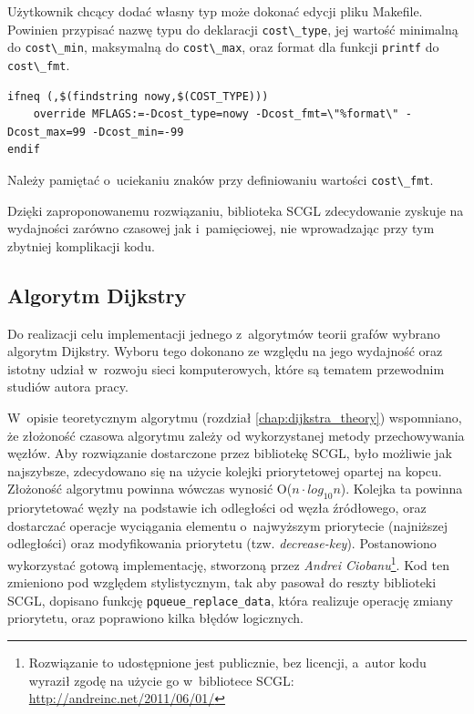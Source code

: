 \documentclass[a4paper,12pt,polish,oneside,openright]{thesis}
\newcommand\code[1]{\lstinline[style=line]{#1}}
\begin{document}
Użytkownik chcący dodać własny typ może dokonać edycji pliku Makefile.
Powinien przypisać nazwę typu do deklaracji \code{cost\_type}, jej wartość minimalną do \code{cost\_min}, maksymalną do \code{cost\_max}, oraz format dla funkcji \code{printf} do \code{cost\_fmt}.
\begin{lstlisting}[style=coden,caption=Przykład nowego typu kosztu krawędzi]
ifneq (,$(findstring nowy,$(COST_TYPE)))
	override MFLAGS:=-Dcost_type=nowy -Dcost_fmt=\"%format\" -Dcost_max=99 -Dcost_min=-99
endif
\end{lstlisting}
Należy pamiętać o~uciekaniu znaków przy definiowaniu wartości \code{cost\_fmt}.

Dzięki zaproponowanemu rozwiązaniu, biblioteka SCGL zdecydowanie zyskuje na wydajności zarówno czasowej jak i~pamięciowej, nie wprowadzając przy tym zbytniej komplikacji kodu.

\subsection{Algorytm Dijkstry}
\label{chap:dijkstra}
Do realizacji celu implementacji jednego z~algorytmów teorii grafów wybrano algorytm Dijkstry.
Wyboru tego dokonano ze względu na jego wydajność oraz istotny udział w~rozwoju sieci komputerowych, które są tematem przewodnim studiów autora pracy.

W~opisie teoretycznym algorytmu (rozdział \ref{chap:dijkstra_theory}) wspomniano, że złożoność czasowa algorytmu zależy od wykorzystanej metody przechowywania węzłów.
Aby rozwiązanie dostarczone przez bibliotekę SCGL, było możliwie jak najszybsze, zdecydowano się na użycie kolejki priorytetowej opartej na kopcu.
Złożoność algorytmu powinna wówczas wynosić O($n \cdot log_{10}{n}$).
Kolejka ta powinna priorytetować węzły na podstawie ich odległości od węzła źródłowego, oraz dostarczać operacje wyciągania elementu o~najwyższym priorytecie (najniższej odległości) oraz modyfikowania priorytetu (tzw. \emph{decrease-key}).
Postanowiono wykorzystać gotową implementację, stworzoną przez \emph{Andrei Ciobanu}\footnote{Rozwiązanie to udostępnione jest publicznie, bez licencji, a~autor kodu wyraził zgodę na użycie go w~bibliotece SCGL: \url{http://andreinc.net/2011/06/01/}}.
Kod ten zmieniono pod względem stylistycznym, tak aby pasował do reszty biblioteki SCGL, dopisano funkcję \code{pqueue_replace_data}, która realizuje operację zmiany priorytetu, oraz poprawiono kilka błędów logicznych.
\end{document}
